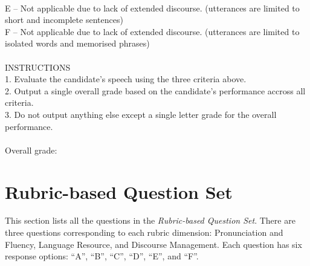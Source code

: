 \documentclass{report}
\begin{document}
\begin{tcolorbox}[breakable, colback=white, colframe=black, title=Direct Scoring Prompt]
\\E -- Not applicable due to lack of extended discourse. (utterances are limited to short and incomplete sentences)
\\F -- Not applicable due to lack of extended discourse. (utterances are limited to isolated words and memorised phrases)
\\\\
INSTRUCTIONS
\\1. Evaluate the candidate's speech using the three criteria above.
\\2. Output a single overall grade based on the candidate's performance accross all criteria.
\\3. Do not output anything else except a single letter grade for the overall performance.
\\\\
Overall grade:
\end{tcolorbox}
\endgroup

\section{Rubric-based Question Set}
\label{app_sec:rubric_based_question_set}
This section lists all the questions in the \emph{Rubric-based Question Set}. There are three questions corresponding to each rubric dimension: Pronunciation and Fluency, Language Resource, and Discourse Management. Each question has six response options: ``A'', ``B'', ``C'', ``D'', ``E'', and ``F''.
\end{document}
